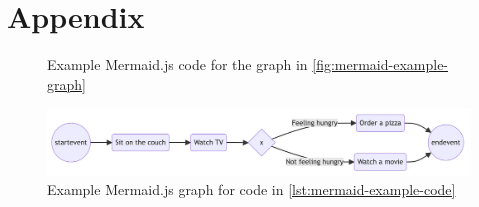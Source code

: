 \appendix
\chapter*{Appendix}

\begin{figure}[h]
    
    \caption{Example Mermaid.js code for the graph in \autoref{fig:mermaid-example-graph}}
    \label{lst:mermaid-example-code}
\end{figure}

\hspace{3cm}

\begin{figure}[h]
    \centering
    \includegraphics[width=\textwidth,keepaspectratio]{../assets/images/Mermaid Graph Example.png}
    \caption{Example Mermaid.js graph for code in \autoref{lst:mermaid-example-code}}
    \label{fig:mermaid-example-graph}
\end{figure}

